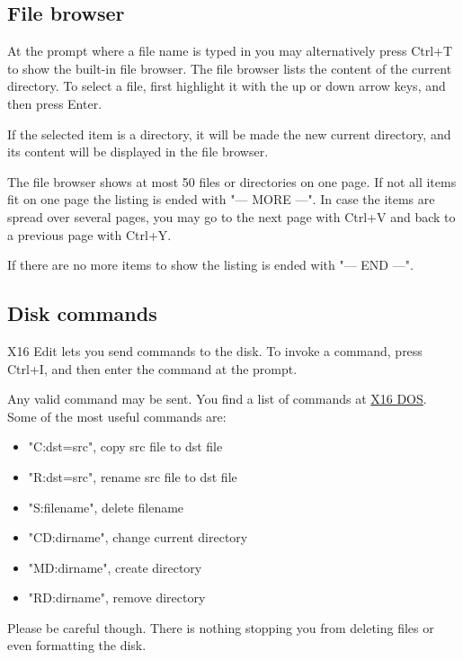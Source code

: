 \documentclass{article}
\begin{document}
    \subsection{File browser}

    At the prompt where a file name is typed in you may alternatively press Ctrl+T to show the
    built-in file browser. The file browser lists the content of the current directory. To select a file,
    first highlight it with the up or down arrow keys, and then press Enter.

    If the selected item is a directory, it will be made the new current directory, and its content will
    be displayed in the file browser.

    The file browser shows at most 50 files or directories on one page. If not all items fit on one page 
    the listing is ended with "--- MORE ---". In case the items are spread over several pages, you may go to 
    the next page with Ctrl+V and back to a previous page with Ctrl+Y.

    If there are no more items to show the listing is ended with "--- END ---".


    \subsection{Disk commands}

    X16 Edit lets you send commands to the disk. To invoke a command, press Ctrl+I, and then enter
    the command at the prompt.

    Any valid command may be sent. You find a list of commands at 
    \href{https://github.com/commanderx16/x16-rom/tree/master/dos}{X16 DOS}. Some of the most useful commands are:

     \begin{itemize} 
            \item "C:dst=src", copy src file to dst file
            \item "R:dst=src", rename src file to dst file
            \item "S:filename", delete filename
            \item "CD:dirname", change current directory
            \item "MD:dirname", create directory
            \item "RD:dirname", remove directory
    \end{itemize}
    
    Please be careful though. There is nothing stopping you from deleting files or even formatting the
    disk.
\end{document}
